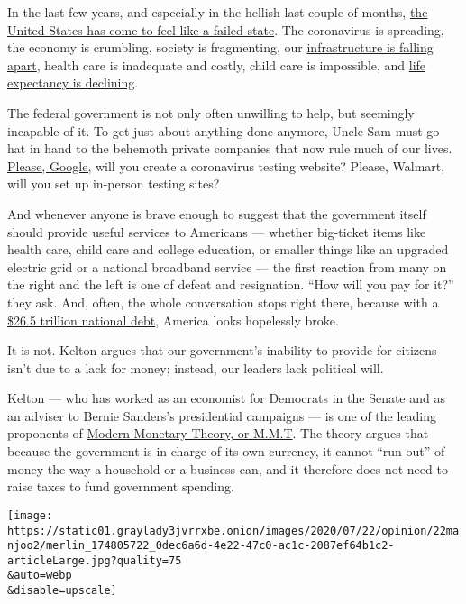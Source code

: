 In the last few years, and especially in the hellish last couple of
months,
\href{https://www.theatlantic.com/magazine/archive/2020/06/underlying-conditions/610261/}{the
United States has come to feel like a failed state}. The coronavirus is
spreading, the economy is crumbling, society is fragmenting, our
\href{https://www.businessinsider.com/asce-gives-us-infrastructure-a-d-2017-3\#bridges-c-2}{infrastructure
is falling apart}, health care is inadequate and costly, child care is
impossible, and
\href{https://www.nytimes3xbfgragh.onion/2019/11/26/health/life-expectancy-rate-usa.html}{life
expectancy is declining}.

The federal government is not only often unwilling to help, but
seemingly incapable of it. To get just about anything done anymore,
Uncle Sam must go hat in hand to the behemoth private companies that now
rule much of our lives.
\href{https://www.nytimes3xbfgragh.onion/2020/03/18/opinion/coronavirus-trump.html}{Please,
Google,} will you create a coronavirus testing website? Please, Walmart,
will you set up in-person testing sites?

And whenever anyone is brave enough to suggest that the government
itself should provide useful services to Americans --- whether
big-ticket items like health care, child care and college education, or
smaller things like an upgraded electric grid or a national broadband
service --- the first reaction from many on the right and the left is
one of defeat and resignation. ``How will you pay for it?'' they ask.
And, often, the whole conversation stops right there, because with a
\href{https://www.treasurydirect.gov/govt/reports/pd/pd_debttothepenny.htm}{\$26.5
trillion national debt}, America looks hopelessly broke.

It is not. Kelton argues that our government's inability to provide for
citizens isn't due to a lack for money; instead, our leaders lack
political will.

Kelton --- who has worked as an economist for Democrats in the Senate
and as an adviser to Bernie Sanders's presidential campaigns --- is one
of the leading proponents of
\href{https://www.vox.com/future-perfect/2019/4/16/18251646/modern-monetary-theory-new-moment-explained}{Modern
Monetary Theory, or M.M.T}. The theory argues that because the
government is in charge of its own currency, it cannot ``run out'' of
money the way a household or a business can, and it therefore does not
need to raise taxes to fund government spending.

\texttt{[image: https://static01.graylady3jvrrxbe.onion/images/2020/07/22/opinion/22manjoo2/merlin\_174805722\_0dec6a6d-4e22-47c0-ac1c-2087ef64b1c2-articleLarge.jpg?quality=75\\\&auto=webp\\\&disable=upscale]}

